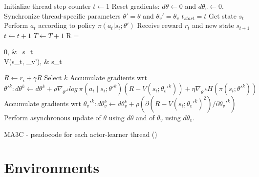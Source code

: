 \begin{algorithm}[hbtp]
\begin{algorithmic}
    \State {}
    \State {}
    \State {}
    \State Initialize thread step counter $t \leftarrow 1$
    \Repeat
        \State Reset gradients: $d\theta \leftarrow 0$ and $d\theta_v \leftarrow 0$.
        \State Synchronize thread-specific parameters $\theta' = \theta$ and $\theta_v' = \theta_v$
        \State $t_{start} = t$
        \State Get state $s_t$
        \Repeat
            \State Perform $a_t$ according to policy $\pi(a_t|s_t;\theta')$
            \State Receive reward $r_t$ and new state $s_{t+1}$
            \State $t \leftarrow t + 1$
            \State $T \leftarrow T + 1$
        \State R = \begin{cases}
                0,   & \ s_t \\
                V(s_t, \theta_v'),   &  s_t \;\\
            \end{cases}
            \State $R \leftarrow r_i + \gamma R$
            \State Select $k$ \;
            \State Accumulate gradients wrt $\theta'^k: d\theta^k \leftarrow d\theta^k + \rho\nabla_{\theta'^k} log\:\pi(a_i\mid s_i;\theta'^k)(R-V(s_i;\theta_v'^k))+\eta\nabla_{\theta'^k}H(\pi(s_i;\theta'^k))$
            \State Accumulate gradients wrt $\theta_v'^k: d\theta_v^k \leftarrow d\theta_v^k + \rho(\partial(R-V(s_i;\theta_v'^k)^{2}) / \partial \theta_{v}'^k)$
        \EndFor
        \State Perform asynchronous update of $\theta$ using $d\theta$ and of $\theta_v$ using $d\theta_v$.
\end{algorithmic}
\caption{\acl{MA3C} - psudocode for each actor-learner thread (\cite{mnih2016A3C})}
\label{alg:MA3C}
\end{algorithm}

\section{Environments\label{sec:Environments}}


